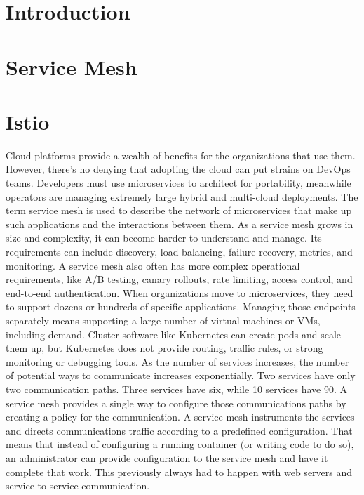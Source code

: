 \documentclass[conference]{IEEEtran}
\begin{document}
\section{Introduction} \label{sec:intro}
\cite{li2019service}

\section{Service Mesh} \label{sec:mesh}

\section{Istio} \label{sec:istio}
Cloud platforms provide a wealth of benefits for the organizations that use them. However, there’s no denying that adopting the cloud can put strains on DevOps teams. Developers must use microservices to architect for portability, meanwhile operators are managing extremely large hybrid and multi-cloud deployments.\cite{Concepts}
The term service mesh is used to describe the network of microservices that make up such applications and the interactions between them. As a service mesh grows in size and complexity, it can become harder to understand and manage. Its requirements can include discovery, load balancing, failure recovery, metrics, and monitoring. A service mesh also often has more complex operational requirements, like A/B testing, canary rollouts, rate limiting, access control, and end-to-end authentication.
When organizations move to microservices, they need to support dozens or hundreds of specific applications. Managing those endpoints separately means supporting a large number of virtual machines or VMs, including demand. Cluster software like Kubernetes can create pods and scale them up, but Kubernetes does not provide routing, traffic rules, or strong monitoring or debugging tools.
As the number of services increases, the number of potential ways to communicate increases exponentially. Two services have only two communication paths. Three services have six, while 10 services have 90. A service mesh provides a single way to configure those communications paths by creating a policy for the communication.
A service mesh instruments the services and directs communications traffic according to a predefined configuration. That means that instead of configuring a running container (or writing code to do so), an administrator can provide configuration to the service mesh and have it complete that work. This previously always had to happen with web servers and service-to-service communication.\cite{IBM}
\end{document}
